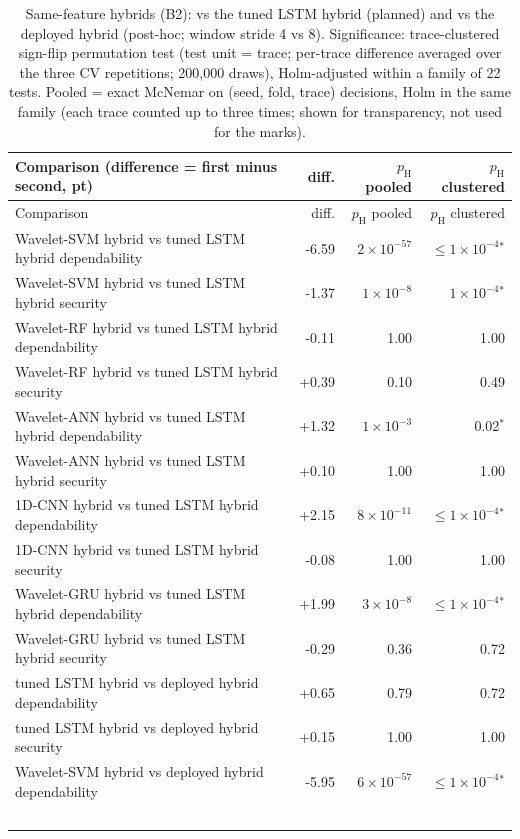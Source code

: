 \begin{longtable}{@{}p{8.6cm}rrr@{}}
\caption{Same-feature hybrids (B2): vs the tuned LSTM hybrid (planned) and vs the deployed hybrid (post-hoc; window stride 4 vs 8). Significance: trace-clustered sign-flip permutation test (test unit = trace; per-trace difference averaged over the three CV repetitions; 200{,}000 draws), Holm-adjusted within a family of 22 tests. Pooled = exact McNemar on (seed, fold, trace) decisions, Holm in the same family (each trace counted up to three times; shown for transparency, not used for the marks).}\label{tab:S4}\\
\toprule Comparison (difference = first minus second, pt) & diff. & $p_{\mathrm{H}}$ pooled & $p_{\mathrm{H}}$ clustered \\ \midrule \endfirsthead
\toprule Comparison & diff. & $p_{\mathrm{H}}$ pooled & $p_{\mathrm{H}}$ clustered \\ \midrule \endhead
Wavelet-SVM hybrid vs tuned LSTM hybrid dependability & -6.59 & $2\times10^{-57}$ & $\le 1\times10^{-4}$$^{*}$ \\
Wavelet-SVM hybrid vs tuned LSTM hybrid security & -1.37 & $1\times10^{-8}$ & $1\times10^{-4}$$^{*}$ \\
Wavelet-RF hybrid vs tuned LSTM hybrid dependability & -0.11 & 1.00 & 1.00 \\
Wavelet-RF hybrid vs tuned LSTM hybrid security & +0.39 & 0.10 & 0.49 \\
Wavelet-ANN hybrid vs tuned LSTM hybrid dependability & +1.32 & $1\times10^{-3}$ & 0.02$^{*}$ \\
Wavelet-ANN hybrid vs tuned LSTM hybrid security & +0.10 & 1.00 & 1.00 \\
1D-CNN hybrid vs tuned LSTM hybrid dependability & +2.15 & $8\times10^{-11}$ & $\le 1\times10^{-4}$$^{*}$ \\
1D-CNN hybrid vs tuned LSTM hybrid security & -0.08 & 1.00 & 1.00 \\
Wavelet-GRU hybrid vs tuned LSTM hybrid dependability & +1.99 & $3\times10^{-8}$ & $\le 1\times10^{-4}$$^{*}$ \\
Wavelet-GRU hybrid vs tuned LSTM hybrid security & -0.29 & 0.36 & 0.72 \\
tuned LSTM hybrid vs deployed hybrid dependability & +0.65 & 0.79 & 0.72 \\
tuned LSTM hybrid vs deployed hybrid security & +0.15 & 1.00 & 1.00 \\
Wavelet-SVM hybrid vs deployed hybrid dependability & -5.95 & $6\times10^{-57}$ & $\le 1\times10^{-4}$$^{*}$ \\
$$
\end{longtable}
